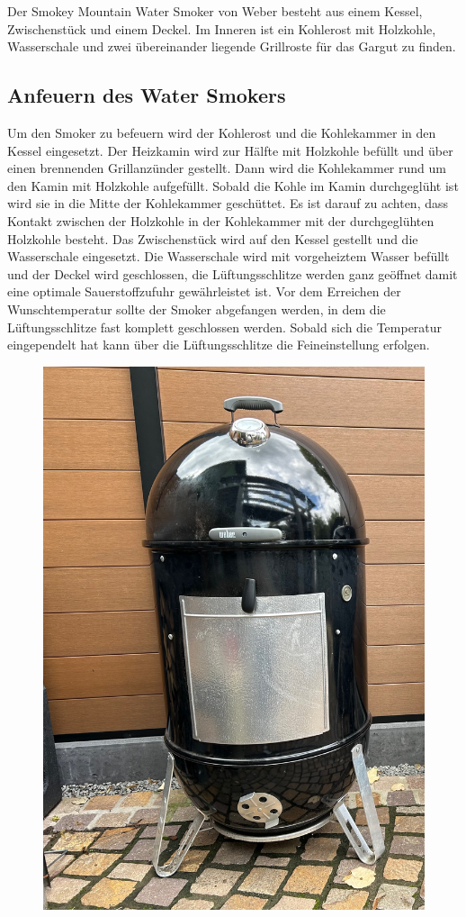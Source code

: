 	Der Smokey Mountain Water Smoker von Weber besteht aus einem Kessel, 
	Zwischenstück und einem Deckel. Im Inneren ist 
	ein Kohlerost mit Holzkohle, 
	Wasserschale und zwei übereinander liegende Grillroste für das Gargut zu 
	finden.

\subsection{Anfeuern des Water Smokers}

	Um den Smoker zu befeuern wird der Kohlerost und die Kohlekammer in den 
	Kessel eingesetzt. Der Heizkamin wird zur 
	Hälfte mit Holzkohle befüllt und über 
	einen brennenden Grillanzünder gestellt. Dann wird die Kohlekammer rund um 
	den Kamin mit Holzkohle aufgefüllt. Sobald die 
	Kohle im Kamin durchgeglüht ist 
	wird sie in die Mitte der Kohlekammer geschüttet. Es ist darauf zu achten, dass 
	Kontakt zwischen der Holzkohle in der 
	Kohlekammer mit der durchgeglühten 
	Holzkohle besteht. Das Zwischenstück wird auf den Kessel gestellt und die 
	Wasserschale eingesetzt. Die Wasserschale wird 
	mit vorgeheiztem Wasser befüllt 
	und der Deckel wird geschlossen, die Lüftungsschlitze werden ganz geöffnet 
	damit eine optimale Sauerstoffzufuhr 
	gewährleistet ist. Vor dem Erreichen der 
	Wunschtemperatur sollte der Smoker abgefangen werden, in dem die 
	Lüftungsschlitze fast komplett geschlossen werden. 
	Sobald sich die Temperatur 
	eingependelt hat kann über die Lüftungsschlitze die Feineinstellung erfolgen. 
	
		\begin{figure}[htbp]
		\centering
		\begin{minipage}{1\textwidth}
			\centering
			\includegraphics[width=.8\linewidth]{pics/Smoker}
			\label{fig:Smoker}
		\end{minipage}%
	\end{figure}
	\newpage
	